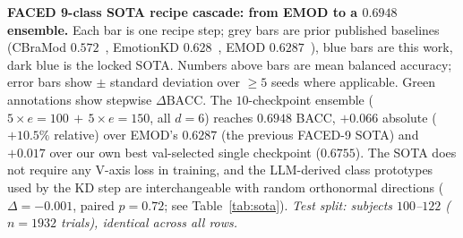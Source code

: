 \textbf{FACED 9-class SOTA recipe cascade: from EMOD to a $0.6948$
ensemble.}
Each bar is one recipe step; grey bars are prior published baselines
(CBraMod $0.572$~\citep{wang2025cbramod}, EmotionKD
$0.628$~\citep{liu2023emotionkd}, EMOD
$0.6287$~\citep{chen2025emod}), blue bars are this work, dark blue
is the locked SOTA. Numbers above bars are mean balanced accuracy;
error bars show $\pm$ standard deviation over $\geq 5$ seeds where
applicable. Green annotations show stepwise $\Delta\mathrm{BACC}$.
The $10$-checkpoint ensemble ($5\!\times\!e{=}100\,+\,5\!\times\!e{=}150$,
all $d{=}6$) reaches $0.6948$ BACC, $+0.066$ absolute ($+10.5\%$
relative) over EMOD's $0.6287$ (the previous FACED-9 SOTA) and
$+0.017$ over our own best val-selected single checkpoint ($0.6755$).
The SOTA does not require any V-axis loss in training, and the
LLM-derived class prototypes used by the KD step are interchangeable
with random orthonormal directions ($\Delta{=}{-}0.001$, paired
$p{=}0.72$; see Table~\ref{tab:sota}).
\emph{Test split: subjects $100$--$122$ ($n{=}1932$ trials), identical
across all rows.}
